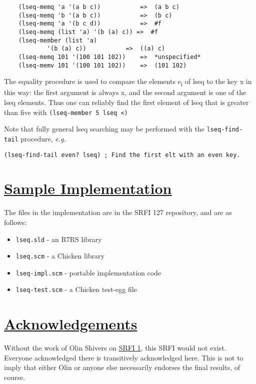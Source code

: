 \begin{verbatim}
    (lseq-memq 'a '(a b c))           =>  (a b c)
    (lseq-memq 'b '(a b c))           =>  (b c)
    (lseq-memq 'a '(b c d))           =>  #f
    (lseq-memq (list 'a) '(b (a) c)) =>  #f
    (lseq-member (list 'a)
            '(b (a) c))           =>  ((a) c)
    (lseq-memq 101 '(100 101 102))    =>  *unspecified*
    (lseq-memv 101 '(100 101 102))    =>  (101 102)
\end{verbatim}

The equality procedure is used to compare the elements
e\textsubscript{i} of lseq to the key x in this way: the first argument
is always x, and the second argument is one of the lseq elements. Thus
one can reliably find the first element of lseq that is greater than
five with \texttt{(lseq-member\ 5\ lseq\ \textless{})}

Note that fully general lseq searching may be performed with the
\texttt{lseq-find-tail} procedure, \emph{e.g.}

\begin{verbatim}
(lseq-find-tail even? lseq) ; Find the first elt with an even key.
\end{verbatim}

\section{\texorpdfstring{\href{}{Sample
Implementation}}{Sample Implementation}}\label{sample-implementation}

The files in the implementation are in the SRFI 127 repository, and are
as follows:

\begin{itemize}
\tightlist
\item
  \texttt{lseq.sld} - an R7RS library
\item
  \texttt{lseq.scm} - a Chicken library
\item
  \texttt{lseq-impl.scm} - portable implementation code
\item
  \texttt{lseq-test.scm} - a Chicken test-egg file
\end{itemize}

\section{\texorpdfstring{\href{}{Acknowledgements}}{Acknowledgements}}\label{acknowledgements}

Without the work of Olin Shivers on
\href{http://srfi.schemers.org/srfi-1/srfi-1.html}{SRFI 1}, this SRFI
would not exist. Everyone acknowledged there is transitively
acknowledged here. This is not to imply that either Olin or anyone else
necessarily endorses the final results, of course.

